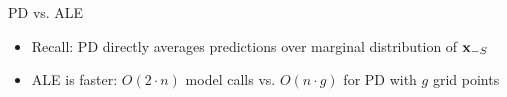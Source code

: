 \documentclass[10pt,compress,t,notes=noshow, xcolor=table]{beamer}
\begin{document}
\begin{frame}{PD vs. ALE}
    \lz
    \begin{itemize}
    \item<1-> Recall: PD directly averages predictions over marginal distribution of $\mathbf{x}_{-S}$
    \item<1-> ALE is faster: $O(2 \cdot n)$ model calls vs. $O(n \cdot g)$ for PD with $g$ grid points
\end{itemize}
\end{frame}
\end{document}
